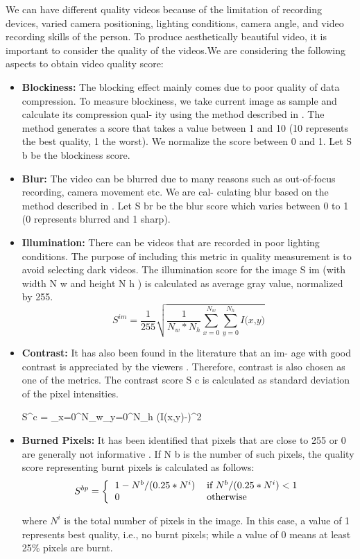 \documentclass{sig-alternate}
\begin{document}
We can have different quality videos because of the limitation of
recording devices, varied camera positioning, lighting conditions,
camera angle, and video recording skills of the person. To produce
aesthetically beautiful video, it is important to consider the quality
of the videos.We are considering the following aspects to obtain
video quality score:

\begin{itemize}
    \item \textbf{Blockiness:} The blocking effect mainly comes due to poor
quality of data compression. To measure blockiness, we take
current image as sample and calculate its compression qual-
ity using the method described in \cite{18}. The method generates
a score that takes a value between 1 and 10 (10 represents the
best quality, 1 the worst). We normalize the score between 0
and 1. Let S b be the blockiness score.
    \item \textbf{Blur: }The video can be blurred due to many reasons such as
out-of-focus recording, camera movement etc. We are cal-
culating blur based on the method described in \cite{5}. Let S br
be the blur score which varies between 0 to 1 (0 represents
blurred and 1 sharp).
    \item \textbf{Illumination: }There can be videos that are recorded in poor
lighting conditions. The purpose of including this metric in
quality measurement is to avoid selecting dark videos. The
illumination score for the image S im (with width N w and
height N h ) is calculated as average gray value, normalized
by 255.
\begin{equation}
S^{im} = \frac{1}{255}\sqrt{\frac{1}{N_w*N_h}\sum_{x=0}^{N_w}\sum_{y=0}^{N_h}\textit{I(x,y)}}
\end{equation}
    \item \textbf{Contrast: }It has also been found in the literature that an im-
age with good contrast is appreciated by the viewers \cite{10}.
Therefore, contrast is also chosen as one of the metrics. The
contrast score S c is calculated as standard deviation of the
pixel intensities.

S^{c} = \sum_{x=0}^{N_w}\sum_{y=0}^{N_h} (I(x,y)-)^{2}

 \item \textbf{Burned Pixels: }It has been identified that pixels that are
close to 255 or 0 are generally not informative \cite{15}. If N b
is the number of such pixels, the quality score representing
burnt pixels is calculated as follows:
\begin{equation}
    S^{bp} = \bigg\{\begin{tabular}{ll}$1-N^b/(0.25*N^i)$ & if$\ N^b/(0.25*N^i)<1$\\0 & otherwise\end{tabular}
\end{equation}

where ${N^{i}}$ is the total number of pixels in the image. In this
case, a value of 1 represents best quality, i.e., no burnt pixels;
while a value of 0 means at least 25\% pixels are burnt.

\end{itemize}
\end{document}
